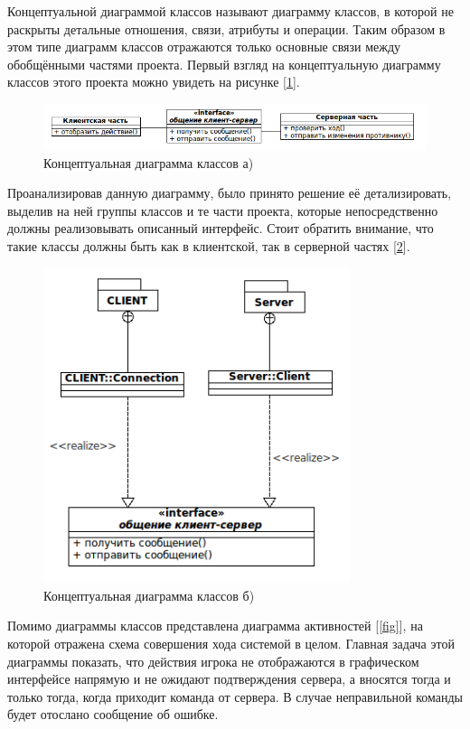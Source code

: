 Концептуальной диаграммой классов называют диаграмму классов, в которой не раскрыты детальные отношения, связи, атрибуты и операции. Таким образом в этом типе диаграмм классов отражаются только основные связи между обобщёнными частями проекта. Первый взгляд на концептуальную диаграмму классов этого проекта можно увидеть на рисунке [\ref{fig1}].

\begin{figure}[ht]
\centering
\includegraphics[width=17cm]{images/class.png}
\caption{Концептуальная диаграмма классов а)}
\label{fig1}
\end{figure}

Проанализировав данную диаграмму, было принято решение её детализировать, выделив на ней группы классов и те части проекта, которые непосредственно должны реализовывать описанный интерфейс. Стоит обратить внимание, что такие классы должны быть как в клиентской, так в серверной частях [\ref{fig2}].

\begin{figure}[ht]
\centering
\includegraphics[width=9cm]{images/class1.png}
\caption{Концептуальная диаграмма классов б)}
\label{fig2}
\end{figure}

Помимо диаграммы классов представлена диаграмма активностей [\ref{fig}], на которой отражена схема совершения хода системой в целом. Главная задача этой диаграммы показать, что действия игрока не отображаются в графическом интерфейсе напрямую и не ожидают подтверждения сервера, а вносятся тогда и только тогда, когда приходит команда от сервера. В случае неправильной команды будет отослано сообщение об ошибке. 

